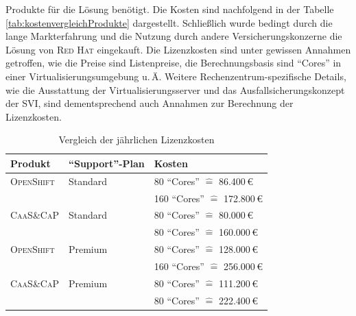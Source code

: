 Produkte für die Lösung benötigt. Die Kosten sind nachfolgend in der Tabelle \vref{tab:kostenvergleichProdukte} dargestellt. Schließlich wurde bedingt durch die lange Markterfahrung und die Nutzung durch andere Versicherungskonzerne die Lösung von \textsc{Red Hat} eingekauft. Die Lizenzkosten sind unter gewissen Annahmen getroffen, wie die Preise sind Listenpreise, die Berechnungsbasis sind \enquote{Cores} in einer Virtualisierungsumgebung u.\,Ä. Weitere Rechenzentrum-spezifische Details, wie die Ausstattung der Virtualisierungsserver und das Ausfallsicherungskonzept der \ac{SVI}, sind dementsprechend auch Annahmen zur Berechnung der Lizenzkosten.

\begin{table}[h!]
	\centering
	
	\begin{tabular}{@{}lll@{}}\toprule[1.5pt]
		
		\textbf{Produkt} & \textbf{\enquote{Support}-Plan} & \textbf{Kosten} \\ \midrule
		\textsc{OpenShift} & Standard & 80 \enquote{Cores} $\widehat{=}$  86.400\,\euro \\
		& & 160 \enquote{Cores} $\widehat{=}$  172.800\,\euro \\
		
		\textsc{CaaS}\&\textsc{CaP} & Standard & 80 \enquote{Cores} $\widehat{=}$  80.000\,\euro \\
		& & 80 \enquote{Cores} $\widehat{=}$  160.000\,\euro \\
		
		\textsc{OpenShift} & Premium & 80 \enquote{Cores} $\widehat{=}$  128.000\,\euro \\
		& & 160 \enquote{Cores} $\widehat{=}$  256.000\,\euro \\
		
		\textsc{CaaS}\&\textsc{CaP} & Premium & 80 \enquote{Cores} $\widehat{=}$  111.200\,\euro \\
		& & 80 \enquote{Cores} $\widehat{=}$  222.400\,\euro \\		
		
		\bottomrule[1.5pt]
	\end{tabular}
	
	\caption{Vergleich der jährlichen Lizenzkosten}
	\label{tab:kostenvergleichProdukte}
	
\end{table}
